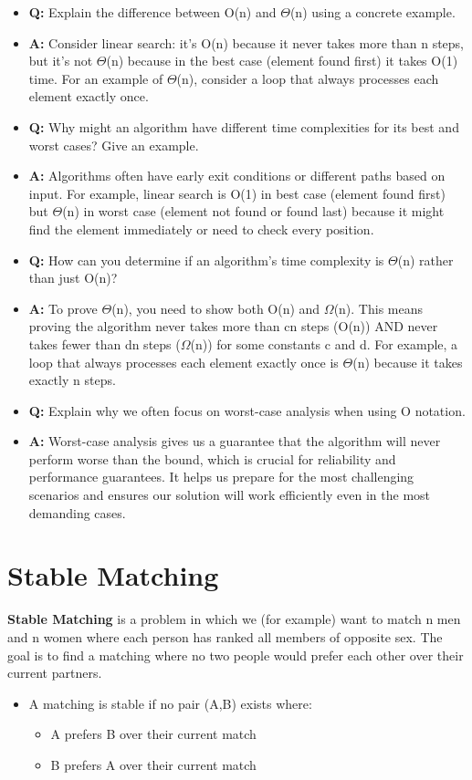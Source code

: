 \documentclass[11pt,a4paper]{article}
\begin{document}
\begin{multicols}{2}
\begin{itemize}
    \item \textbf{Q:} Explain the difference between O(n) and $\Theta$(n) using a concrete example.
    \item \textbf{A:} Consider linear search: it's O(n) because it never takes more than n steps, but it's not $\Theta$(n) because in the best case (element found first) it takes O(1) time. For an example of $\Theta$(n), consider a loop that always processes each element exactly once.

    \item \textbf{Q:} Why might an algorithm have different time complexities for its best and worst cases? Give an example.
    \item \textbf{A:} Algorithms often have early exit conditions or different paths based on input. For example, linear search is O(1) in best case (element found first) but $\Theta$(n) in worst case (element not found or found last) because it might find the element immediately or need to check every position.

    \item \textbf{Q:} How can you determine if an algorithm's time complexity is $\Theta$(n) rather than just O(n)?
    \item \textbf{A:} To prove $\Theta$(n), you need to show both O(n) and $\Omega$(n). This means proving the algorithm never takes more than cn steps (O(n)) AND never takes fewer than dn steps ($\Omega$(n)) for some constants c and d. For example, a loop that always processes each element exactly once is $\Theta$(n) because it takes exactly n steps.

    \item \textbf{Q:} Explain why we often focus on worst-case analysis when using O notation.
    \item \textbf{A:} Worst-case analysis gives us a guarantee that the algorithm will never perform worse than the bound, which is crucial for reliability and performance guarantees. It helps us prepare for the most challenging scenarios and ensures our solution will work efficiently even in the most demanding cases.
\end{itemize}

\section{Stable Matching}
\textbf{Stable Matching} is a problem in which we (for example) want to match n men and n women where each person has ranked all members of opposite sex. The goal is to find a matching where no two people would prefer each other over their current partners.
\begin{itemize}
    \item A matching is stable if no pair (A,B) exists where:
        \begin{itemize}
            \item A prefers B over their current match
            \item B prefers A over their current match
        \end{itemize}
\end{itemize}


\end{multicols}
\end{document}
